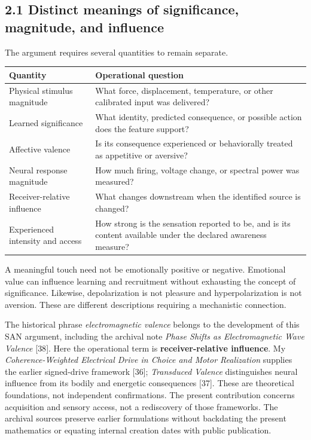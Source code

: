 \documentclass[
  american,
  11pt,
  letterpaper,
]{article}
\newcounter{none} %
\begin{document}
\subsection{2.1 Distinct meanings of significance, magnitude, and influence}\label{distinct-meanings-of-significance-magnitude-and-influence}

The argument requires several quantities to remain separate.

{\def\LTcaptype{none} %
\begin{longtable}[]{@{}
  >{\raggedright\arraybackslash}p{}
  >{\raggedright\arraybackslash}p{}@{}}
\toprule\noalign{}
\begin{minipage}[b]{\linewidth}\raggedright
Quantity
\end{minipage} & \begin{minipage}[b]{\linewidth}\raggedright
Operational question
\end{minipage} \\
\midrule\noalign{}
\endhead
\bottomrule\noalign{}
\endlastfoot
Physical stimulus magnitude & What force, displacement, temperature, or other calibrated input was delivered? \\
Learned significance & What identity, predicted consequence, or possible action does the feature support? \\
Affective valence & Is its consequence experienced or behaviorally treated as appetitive or aversive? \\
Neural response magnitude & How much firing, voltage change, or spectral power was measured? \\
Receiver-relative influence & What changes downstream when the identified source is changed? \\
Experienced intensity and access & How strong is the sensation reported to be, and is its content available under the declared awareness measure? \\
\end{longtable}
}

A meaningful touch need not be emotionally positive or negative. Emotional value can influence learning and recruitment without exhausting the concept of significance. Likewise, depolarization is not pleasure and hyperpolarization is not aversion. These are different descriptions requiring a mechanistic connection.

The historical phrase \emph{electromagnetic valence} belongs to the development of this SAN argument, including the archival note \emph{Phase Shifts as Electromagnetic Wave Valence} {[}38{]}. Here the operational term is \textbf{receiver-relative influence}. My \emph{Coherence-Weighted Electrical Drive in Choice and Motor Realization} supplies the earlier signed-drive framework {[}36{]}; \emph{Transduced Valence} distinguishes neural influence from its bodily and energetic consequences {[}37{]}. These are theoretical foundations, not independent confirmations. The present contribution concerns acquisition and sensory access, not a rediscovery of those frameworks. The archival sources preserve earlier formulations without backdating the present mathematics or equating internal creation dates with public publication.
\end{document}
